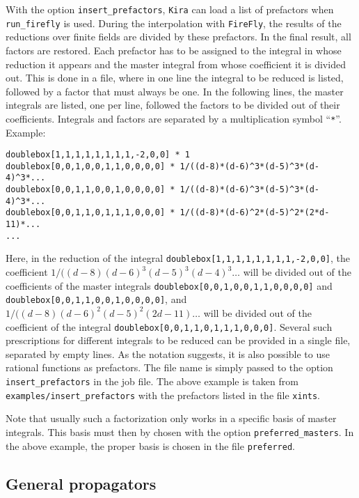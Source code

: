 \documentclass[11pt,a4paper,DIV=11,numbers=noenddot,parskip=half]{scrartcl}
\newcommand{\code}[1]{\texttt{#1}}
\newcommand*{\kira}{\code{Kira}}
\begin{document}
With the option \code{insert\_prefactors}, \kira{} can load a list of prefactors when \code{run\_firefly} is used.
During the interpolation with \code{FireFly}, the results of the reductions over finite fields are divided by these prefactors.
In the final result, all factors are restored.
Each prefactor has to be assigned to the integral in whose reduction it appears and the master integral from whose coefficient it is divided out.
This is done in a file, where in one line the integral to be reduced is listed, followed by a factor that must always be one.
In the following lines, the master integrals are listed, one per line, followed the factors to be divided out of their coefficients.
Integrals and factors are separated by a multiplication symbol ``\code{*}''.
Example:
%
\begin{verbatim}
doublebox[1,1,1,1,1,1,1,1,-2,0,0] * 1
doublebox[0,0,1,0,0,1,1,0,0,0,0] * 1/((d-8)*(d-6)^3*(d-5)^3*(d-4)^3*...
doublebox[0,0,1,1,0,0,1,0,0,0,0] * 1/((d-8)*(d-6)^3*(d-5)^3*(d-4)^3*...
doublebox[0,0,1,1,0,1,1,1,0,0,0] * 1/((d-8)*(d-6)^2*(d-5)^2*(2*d-11)*...
...
\end{verbatim}
%
Here, in the reduction of the integral \verb|doublebox[1,1,1,1,1,1,1,1,-2,0,0]|,
the coefficient $1/((d-8)(d-6)^3(d-5)^3(d-4)^3\dots$ will be divided out of the
coefficients of the master integrals \verb|doublebox[0,0,1,0,0,1,1,0,0,0,0]|
and \verb|doublebox[0,0,1,1,0,0,1,0,0,0,0]|,
and $1/((d-8)(d-6)^2(d-5)^2(2d-11)\dots$ will be divided out of the
coefficient of the integral \verb|doublebox[0,0,1,1,0,1,1,1,0,0,0]|.
Several such prescriptions for different integrals to be reduced can be provided in a single file, separated by empty lines.
As the notation suggests, it is also possible to use rational functions as prefactors.
The file name is simply passed to the option \code{insert\_prefactors} in the job file.
The above example is taken from \code{examples/insert\_prefactors} with the prefactors listed in the file \code{xints}.

Note that usually such a factorization only works in a specific basis of master integrals.
This basis must then by chosen with the option \code{preferred\_masters}.
In the above example, the proper basis is chosen in the file \texttt{preferred}.


\subsection{General propagators}
\label{subsect:general-propagators}
\end{document}
